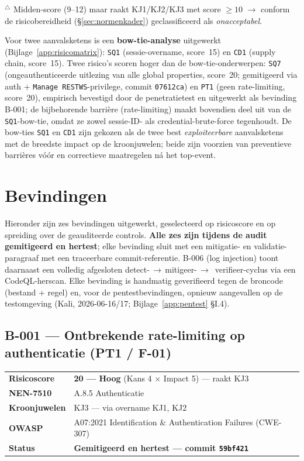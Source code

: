 \documentclass[12pt, a4paper]{report}
\newcommand{\rood}[1]{\textcolor{avansRed}{\textbf{#1}}}
\newcommand{\groen}[1]{\textcolor{ragGreen}{\textbf{#1}}}
\begin{document}
\noindent\small $^\triangle$ Midden-score (9--12) maar raakt KJ1/KJ2/KJ3 met
score $\geq 10$ $\to$ conform de risicobereidheid (\S\ref{sec:normenkader})
geclassificeerd als \emph{onacceptabel}.\normalsize

\vspace{0.6em}
Voor twee aanvalsketens is een \textbf{bow-tie-analyse} uitgewerkt
(Bijlage~\ref{app:risicomatrix}): \texttt{SQ1} (sessie-overname, score~15)
en \texttt{CD1} (supply chain, score~15). Twee risico's scoren hoger dan de bow-tie-onderwerpen:
\texttt{SQ7} (ongeauthenticeerde uitlezing van alle global properties, score~20; gemitigeerd via
auth + \texttt{Manage RESTWS}-privilege, commit \texttt{07612ca}) en \texttt{PT1} (geen
rate-limiting, score~20), empirisch bevestigd door de penetratietest
en uitgewerkt als bevinding B-001; de bijbehorende barrière (rate-limiting) maakt bovendien
deel uit van de \texttt{SQ1}-bow-tie, omdat ze zowel sessie-ID- als credential-brute-force
tegenhoudt. De bow-ties \texttt{SQ1} en \texttt{CD1} zijn gekozen als de twee best
\emph{exploiteerbare} aanvalsketens met de breedste impact op de kroonjuwelen; beide
zijn voorzien van preventieve barrières vóór en correctieve maatregelen ná het
top-event.

\section{Bevindingen}
\label{sec:bevindingen}

Hieronder zijn zes bevindingen uitgewerkt, geselecteerd op risicoscore en op
spreiding over de geauditeerde controls. \textbf{Alle zes zijn tijdens de audit
gemitigeerd en hertest}; elke bevinding sluit met een mitigatie- en
validatie-paragraaf met een traceerbare commit-referentie. B-006 (log injection)
toont daarnaast een volledig afgesloten detect-\,$\to$\,mitigeer-\,$\to$\,%
verifieer-cyclus via een CodeQL-herscan. Elke bevinding is handmatig
geverifieerd tegen de broncode (bestand + regel) en, voor de pentestbevindingen,
opnieuw aangevallen op de testomgeving (Kali, 2026-06-16/17;
Bijlage~\ref{app:pentest} \S I.4).

\subsection{B-001 --- Ontbrekende rate-limiting op authenticatie (PT1 / F-01)}
\label{sec:b001}

\begin{tabular}{@{}l >{\raggedright\arraybackslash}p{11.4cm}@{}}
\textbf{Risicoscore} & \rood{20 --- Hoog} (Kans 4 $\times$ Impact 5) --- raakt KJ3 \\
\textbf{NEN-7510}    & A.8.5 Authenticatie \\
\textbf{Kroonjuwelen}& KJ3 --- via overname KJ1, KJ2 \\
\textbf{OWASP}       & A07:2021 Identification \& Authentication Failures (CWE-307) \\
\textbf{Status}      & \groen{Gemitigeerd en hertest --- commit \texttt{59bf421}} \\
\end{tabular}
\end{document}

